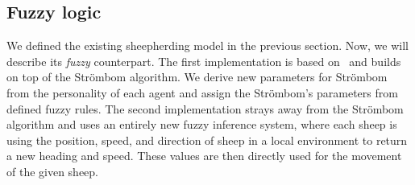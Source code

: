 \documentclass[9pt]{pnas-new}
\begin{document}


\subsection{Fuzzy logic}
We defined the existing sheepherding model in the previous section. Now, we will describe its \textit{fuzzy} counterpart. The first implementation is based on~\cite{fuzzylogic} and builds on top of the Str\"{o}mbom algorithm. We derive new parameters for Str\"{o}mbom from the personality of each agent and assign the Str\"{o}mbom's parameters from defined fuzzy rules. The second implementation strays away from the Str\"{o}mbom algorithm and uses an entirely new fuzzy inference system, where each sheep is using the position, speed, and direction of sheep in a local environment to return a new heading and speed. These values are then directly used for the movement of the given sheep.
\end{document}
